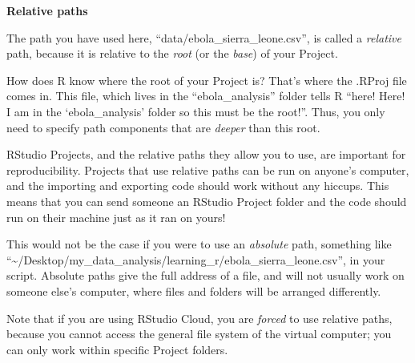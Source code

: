 \documentclass[
  letterpaper,
  DIV=11,
  numbers=noendperiod]{scrreprt}
\begin{document}
\begin{tcolorbox}[enhanced jigsaw, titlerule=0mm, colback=white, left=2mm, breakable, opacitybacktitle=0.6, colbacktitle=quarto-callout-note-color!10!white, colframe=quarto-callout-note-color-frame, bottomtitle=1mm, opacityback=0, coltitle=black, arc=.35mm, toptitle=1mm, title=\textcolor{quarto-callout-note-color}{\faInfo}\hspace{0.5em}{Key Point}, leftrule=.75mm, toprule=.15mm, bottomrule=.15mm, rightrule=.15mm]

\textbf{Relative paths}

The path you have used here, ``data/ebola\_sierra\_leone.csv'', is
called a \emph{relative} path, because it is relative to the \emph{root}
(or the \emph{base}) of your Project.

How does R know where the root of your Project is? That's where the
.RProj file comes in. This file, which lives in the ``ebola\_analysis''
folder tells R ``here! Here! I am in the `ebola\_analysis' folder so
this must be the root!''. Thus, you only need to specify path components
that are \emph{deeper} than this root.

RStudio Projects, and the relative paths they allow you to use, are
important for reproducibility. Projects that use relative paths can be
run on anyone's computer, and the importing and exporting code should
work without any hiccups. This means that you can send someone an
RStudio Project folder and the code should run on their machine just as
it ran on yours!

This would not be the case if you were to use an \emph{absolute} path,
something like
``\textasciitilde/Desktop/my\_data\_analysis/learning\_r/ebola\_sierra\_leone.csv'',
in your script. Absolute paths give the full address of a file, and will
not usually work on someone else's computer, where files and folders
will be arranged differently.

\end{tcolorbox}

\begin{tcolorbox}[enhanced jigsaw, titlerule=0mm, colback=white, left=2mm, breakable, opacitybacktitle=0.6, colbacktitle=quarto-callout-note-color!10!white, colframe=quarto-callout-note-color-frame, bottomtitle=1mm, opacityback=0, coltitle=black, arc=.35mm, toptitle=1mm, title=\textcolor{quarto-callout-note-color}{\faInfo}\hspace{0.5em}{RStudio Cloud}, leftrule=.75mm, toprule=.15mm, bottomrule=.15mm, rightrule=.15mm]

Note that if you are using RStudio Cloud, you are \emph{forced} to use
relative paths, because you cannot access the general file system of the
virtual computer; you can only work within specific Project folders.

\end{tcolorbox}
\end{document}
